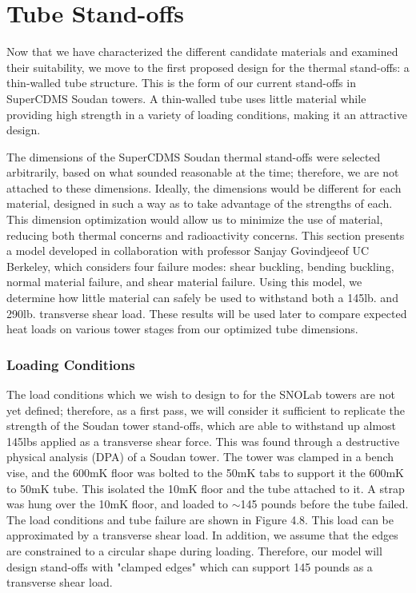 \documentclass{report}
\begin{document}
\section{Tube Stand-offs}

Now that we have characterized the different candidate materials and examined their suitability, we move to the first proposed design for the thermal stand-offs: a thin-walled tube structure. This is the form of our current stand-offs in SuperCDMS Soudan towers. A thin-walled tube uses little material while providing high strength in a variety of loading conditions, making it an attractive design.

The dimensions of the SuperCDMS Soudan thermal stand-offs were selected arbitrarily, based on what sounded reasonable at the time; therefore, we are not attached to these dimensions. Ideally, the dimensions would be different for each material, designed in such a way as to take advantage of the strengths of each. This dimension optimization would allow us to minimize the use of material, reducing both thermal concerns and radioactivity concerns. This section presents a model developed in collaboration with professor Sanjay Govindjee\footnotemark  of UC Berkeley, which considers four failure modes: shear buckling, bending buckling, normal material failure, and shear material failure. Using this model, we determine how little material can safely be used to withstand both a 145lb. and 290lb. transverse shear load. These results will be used later to compare expected heat loads on various tower stages from our optimized tube dimensions.


\subsubsection{Loading Conditions}

The load conditions which we wish to design to for the SNOLab towers are not yet defined; therefore, as a first pass, we will consider it sufficient to replicate the strength of the Soudan tower stand-offs, which are able to withstand up almost 145lbs applied as a transverse shear force. This was found through a destructive physical analysis (DPA) of a Soudan tower. The tower was clamped in a bench vise, and the 600mK floor was bolted to the 50mK tabs to support it the 600mK to 50mK tube. This isolated the 10mK floor and the tube attached to it. A strap was hung over the 10mK floor, and loaded to $\sim$145 pounds before the tube failed. The load conditions and tube failure are shown in Figure 4.8. This load can be approximated by a transverse shear load. In addition, we assume that the edges are constrained to a circular shape during loading. Therefore, our model will design stand-offs with "clamped edges" which can support 145 pounds as a transverse shear load.
\end{document}
